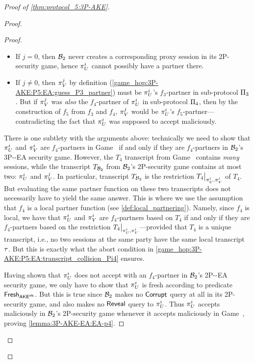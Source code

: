 \begin{proof}[Proof of \cref{thm:protocol_5:3P-AKE}]
\begin{proof}
\begin{proof}
\begin{itemize}
	\item If $j = 0$,
	then $\A[B]_2$ never creates a corresponding proxy session in its 2P-\akenfstext security game,
	hence $\oracle[U][i]$ cannot possibly have a partner there.

	\item If $j \neq 0$,
	then $\oracle[V][j]$ by definition
	(\cref{game_hop:3P-AKE:P5:EA:guess_P3_partner})
	must be $\oracle[U][i]$'s $f_3$-partner in sub-protocol $\protocol_3$.
	But if $\oracle[V][j]$ was \emph{also} the $f_4$-partner of $\oracle[U][i]$ in sub-protocol $\protocol_4$,
	then by the construction of $f_5$ from $f_3$ and $f_4$, $\oracle[V][j]$ would be $\oracle[U][i]$'s $f_5$-partner---contradicting the fact that $\oracle[U][i]$ was supposed to accept maliciously.



\end{itemize}

There is one subtlety with the arguments above:
technically we need to show that $\oracle[U][i]$ and $\oracle[V][i]$ are $f_4$-partners in Game~\game{} if and only if they are $f_4$-partners in $\A[B]_2$'s 3P-\akenfstext-EA security game.
However, the $T_4$ transcript from Game~\game{} contains \emph{many} sessions,
while the transcript $T_{\A[B]_2}$ from $\A[B]_2$'s  2P-\akenfstext security game contains at most two: $\oracle[U][i]$ and $\oracle[V][j]$.
In particular,
transcript $T_{\A[B]_2}$ is the restriction $\restrict{T_4}{\oracle[U][i], \oracle[V][i]}$ of $T_4$.
But evaluating the same partner function on these two transcripts does not necessarily have to yield the same answer.
This is where we use the assumption that $f_4$ is a local partner function
(see \cref{def:local_partnering}).
Namely,
since $f_4$ is local,
we have that
$\oracle[U][i]$ and $\oracle[V][i]$ are $f_4$-partners based on $T_4$ if and only if they are $f_4$-partners based on the restriction $\restrict{T_4}{\oracle[U][i], \oracle[V][i]}$---provided that $T_4$ is a unique transcript,
i.e., no two sessions at the same party have the same local transcript $\localtranscript$.
But this is exactly what the abort condition in \cref{game_hop:3P-AKE:P5:EA:transcript_collision_Pi4} ensures. 


Having shown that $\oracle[U][i]$ does not accept with an $f_4$-partner in $\A[B]_2$'s 2P-\akenfstext-EA security game,
we only have to show that $\oracle[U][i]$ is fresh according to predicate $\fresh_{\akenfs}$.
But this is true since $\A[B]_2$ makes no $\Corrupt$ query at all in its 2P-\akenfstext security game,
and also makes no $\Reveal$ query to $\oracle[U][i]$.
Thus $\oracle[U][i]$ accepts maliciously in $\A[B]_2$'s 2P-\akenfstext security game whenever it accepts maliciously in Game~\game{},
proving \cref{lemma:3P-AKE-EA:EA-p4}.
\end{proof}


\end{proof}
\end{proof}
